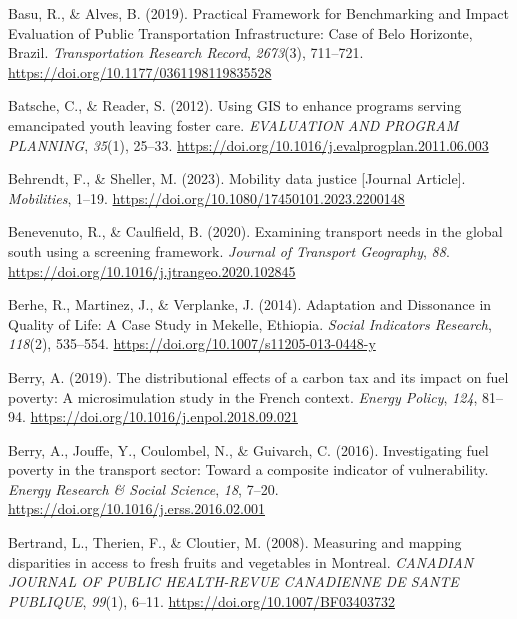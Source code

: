 \documentclass[
  letterpaper,
  DIV=11,
  numbers=noendperiod]{scrartcl}
\newlength{\cslhangindent}
\newenvironment{CSLReferences}[2] %
 {\begin{list}{}{%
  \setlength{\itemindent}{0pt}
  \setlength{\leftmargin}{0pt}
  \setlength{\parsep}{0pt}
  \ifodd #1
   \setlength{\leftmargin}{\cslhangindent}
   \setlength{\itemindent}{-1\cslhangindent}
  \fi
  \setlength{\itemsep}{#2\baselineskip}}}
 {\end{list}}
\begin{document}
\begin{CSLReferences}{1}{0}
Basu, R., \& Alves, B. (2019). Practical {Framework} for {Benchmarking}
and {Impact Evaluation} of {Public Transportation Infrastructure}:
{Case} of {Belo Horizonte}, {Brazil}. \emph{Transportation Research
Record}, \emph{2673}(3), 711--721.
\url{https://doi.org/10.1177/0361198119835528}

Batsche, C., \& Reader, S. (2012). Using {GIS} to enhance programs
serving emancipated youth leaving foster care. \emph{EVALUATION AND
PROGRAM PLANNING}, \emph{35}(1), 25--33.
\url{https://doi.org/10.1016/j.evalprogplan.2011.06.003}

Behrendt, F., \& Sheller, M. (2023). Mobility data justice {[}Journal
Article{]}. \emph{Mobilities}, 1--19.
\url{https://doi.org/10.1080/17450101.2023.2200148}

Benevenuto, R., \& Caulfield, B. (2020). Examining transport needs in
the global south using a screening framework. \emph{Journal of Transport
Geography}, \emph{88}.
\url{https://doi.org/10.1016/j.jtrangeo.2020.102845}

Berhe, R., Martinez, J., \& Verplanke, J. (2014). Adaptation and
{Dissonance} in {Quality} of {Life}: {A Case Study} in {Mekelle},
{Ethiopia}. \emph{Social Indicators Research}, \emph{118}(2), 535--554.
\url{https://doi.org/10.1007/s11205-013-0448-y}

Berry, A. (2019). The distributional effects of a carbon tax and its
impact on fuel poverty: {A} microsimulation study in the {French}
context. \emph{Energy Policy}, \emph{124}, 81--94.
\url{https://doi.org/10.1016/j.enpol.2018.09.021}

Berry, A., Jouffe, Y., Coulombel, N., \& Guivarch, C. (2016).
Investigating fuel poverty in the transport sector: {Toward} a composite
indicator of vulnerability. \emph{Energy Research \& Social Science},
\emph{18}, 7--20. \url{https://doi.org/10.1016/j.erss.2016.02.001}

Bertrand, L., Therien, F., \& Cloutier, M. (2008). Measuring and mapping
disparities in access to fresh fruits and vegetables in {Montreal}.
\emph{CANADIAN JOURNAL OF PUBLIC HEALTH-REVUE CANADIENNE DE SANTE
PUBLIQUE}, \emph{99}(1), 6--11. \url{https://doi.org/10.1007/BF03403732}


\end{CSLReferences}
\end{document}
